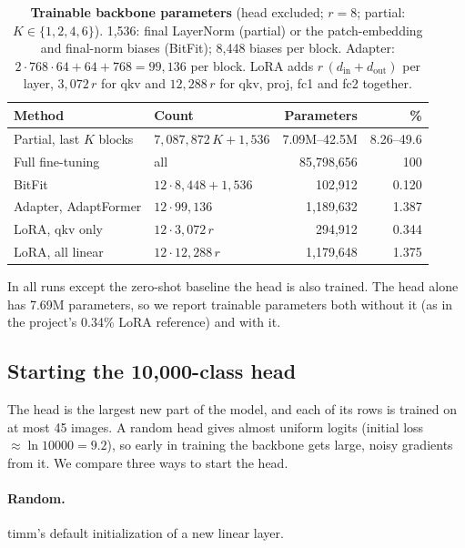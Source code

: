 \begin{table}[t]
  \centering
  \footnotesize
  \setlength{\tabcolsep}{2pt}
  \begin{tabular}{@{}llrr@{}}
    \toprule
    Method & Count & Parameters & \% \\
    \midrule
    Partial, last $K$ blocks & $7{,}087{,}872\,K + 1{,}536$ & 7.09M--42.5M & 8.26--49.6 \\
    Full fine-tuning & all & 85,798,656 & 100 \\
    BitFit & $12 \cdot 8{,}448 + 1{,}536$ & 102,912 & 0.120 \\
    Adapter, AdaptFormer & $12 \cdot 99{,}136$ & 1,189,632 & 1.387 \\
    LoRA, qkv only & $12 \cdot 3{,}072\,r$ & 294,912 & 0.344 \\
    LoRA, all linear & $12 \cdot 12{,}288\,r$ & 1,179,648 & 1.375 \\
    \bottomrule
  \end{tabular}
  \caption{\textbf{Trainable backbone parameters} (head excluded; $r = 8$; partial: $K \in \{1, 2, 4, 6\}$).
  1,536: final LayerNorm (partial) or the patch-embedding and final-norm biases (BitFit); 8,448 biases per block.
  Adapter: $2 \cdot 768 \cdot 64 + 64 + 768 = 99{,}136$ per block.
  LoRA adds $r\,(d_\text{in} + d_\text{out})$ per layer, \ie $3{,}072\,r$ for qkv and $12{,}288\,r$ for qkv, proj, fc1 and fc2 together.}
  \label{tab:params}
\end{table}

In all runs except the zero-shot baseline the head is also trained.
The head alone has 7.69M parameters, so we report trainable parameters both without it (as in the project's 0.34\% LoRA reference) and with it.

\subsection{Starting the 10,000-class head}
\label{sec:head-init}

The head is the largest new part of the model, and each of its rows is trained on at most 45 images.
A random head gives almost uniform logits (initial loss $\approx \ln 10000 = 9.2$), so early in training the backbone gets large, noisy gradients from it.
We compare three ways to start the head.

\paragraph{Random.} timm's default initialization of a new linear layer.

